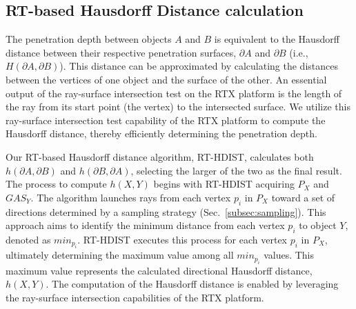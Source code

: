 
%







\subsection{RT-based Hausdorff Distance calculation}\label{sec:RT-Hausdorff}

The penetration depth between objects $A$ and $B$ is equivalent to the Hausdorff distance between their respective penetration surfaces, $\partial A$ and $\partial B$ (i.e., $H(\partial A, \partial B)$).
This distance can be approximated by calculating the distances between the vertices of one object and the surface of the other.
An essential output of the ray-surface intersection test on the RTX platform is the length of the ray from its start point (the vertex) to the intersected surface.
We utilize this ray-surface intersection test capability of the RTX platform to compute the Hausdorff distance, thereby efficiently determining the penetration depth.

Our RT-based Hausdorff distance algorithm, RT-HDIST, calculates both $h(\partial A,\partial B)$ and $h(\partial B,\partial A)$, selecting the larger of the two as the final result.
The process to compute $h(X,Y)$ begins with RT-HDIST acquiring $P_X$  and $GAS_Y$.
The algorithm launches rays from each vertex $p_i$ in $P_X$ toward a set of directions determined by a sampling strategy (Sec.~\ref{subsec:sampling}).
This approach aims to identify the minimum distance from each vertex $p_i$ to object $Y$, denoted as $min_{p_i}$.
RT-HDIST executes this process for each vertex $p_i$ in $P_X$, ultimately determining the maximum value among all $min_{p_i}$ values.
This maximum value represents the calculated directional Hausdorff distance, $h(X,Y)$.
The computation of the Hausdorff distance is enabled by leveraging the ray-surface intersection capabilities of the RTX platform.

